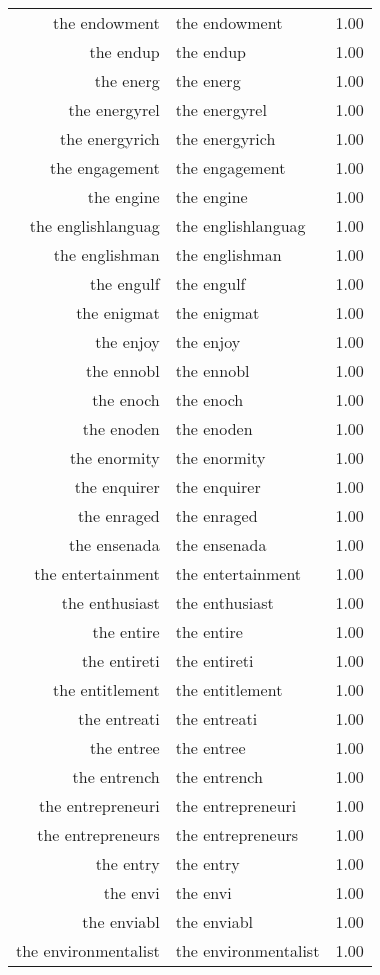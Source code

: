 \begin{table}[ht]
\begin{tabular}{rlr}
  the endowment & the endowment & 1.00 \\ 
  the endup & the endup & 1.00 \\ 
  the energ & the energ & 1.00 \\ 
  the energyrel & the energyrel & 1.00 \\ 
  the energyrich & the energyrich & 1.00 \\ 
  the engagement & the engagement & 1.00 \\ 
  the engine & the engine & 1.00 \\ 
  the englishlanguag & the englishlanguag & 1.00 \\ 
  the englishman & the englishman & 1.00 \\ 
  the engulf & the engulf & 1.00 \\ 
  the enigmat & the enigmat & 1.00 \\ 
  the enjoy & the enjoy & 1.00 \\ 
  the ennobl & the ennobl & 1.00 \\ 
  the enoch & the enoch & 1.00 \\ 
  the enoden & the enoden & 1.00 \\ 
  the enormity & the enormity & 1.00 \\ 
  the enquirer & the enquirer & 1.00 \\ 
  the enraged & the enraged & 1.00 \\ 
  the ensenada & the ensenada & 1.00 \\ 
  the entertainment & the entertainment & 1.00 \\ 
  the enthusiast & the enthusiast & 1.00 \\ 
  the entire & the entire & 1.00 \\ 
  the entireti & the entireti & 1.00 \\ 
  the entitlement & the entitlement & 1.00 \\ 
  the entreati & the entreati & 1.00 \\ 
  the entree & the entree & 1.00 \\ 
  the entrench & the entrench & 1.00 \\ 
  the entrepreneuri & the entrepreneuri & 1.00 \\ 
  the entrepreneurs & the entrepreneurs & 1.00 \\ 
  the entry & the entry & 1.00 \\ 
  the envi & the envi & 1.00 \\ 
  the enviabl & the enviabl & 1.00 \\ 
  the environmentalist & the environmentalist & 1.00 \\ 

\end{tabular}
\end{table}
